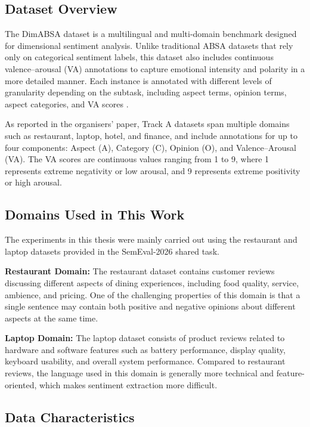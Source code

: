 \documentclass{article}
\begin{document}
\subsection{Dataset Overview}

The DimABSA dataset is a multilingual and multi-domain benchmark designed for dimensional sentiment analysis. Unlike traditional ABSA datasets that rely only on categorical sentiment labels, this dataset also includes continuous valence–arousal (VA) annotations to capture emotional intensity and polarity in a more detailed manner. Each instance is annotated with different levels of granularity depending on the subtask, including aspect terms, opinion terms, aspect categories, and VA scores \cite{lee2026dimabsabuildingmultilingualmultidomain}.

As reported in the organisers' paper, Track A datasets span multiple domains such as restaurant, laptop, hotel, and finance, and include annotations for up to four components: Aspect (A), Category (C), Opinion (O), and Valence–Arousal (VA). The VA scores are continuous values ranging from 1 to 9, where 1 represents extreme negativity or low arousal, and 9 represents extreme positivity or high arousal.

\subsection{Domains Used in This Work}

The experiments in this thesis were mainly carried out using the restaurant and laptop datasets provided in the SemEval-2026 shared task.

\textbf{Restaurant Domain:}  
The restaurant dataset contains customer reviews discussing different aspects of dining experiences, including food quality, service, ambience, and pricing. One of the challenging properties of this domain is that a single sentence may contain both positive and negative opinions about different aspects at the same time.

\textbf{Laptop Domain:}  
The laptop dataset consists of product reviews related to hardware and software features such as battery performance, display quality, keyboard usability, and overall system performance. Compared to restaurant reviews, the language used in this domain is generally more technical and feature-oriented, which makes sentiment extraction more difficult.

\subsection{Data Characteristics}
\end{document}
